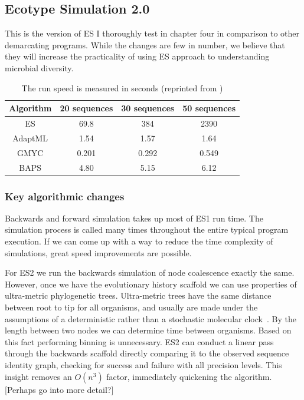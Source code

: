 \subsection*{Ecotype Simulation 2.0}
This is the version of ES I thoroughly test in chapter four in comparison to other demarcating programs.
While the changes are few in number, we believe that they will increase the practicality of using ES approach to understanding microbial diversity.

\begin{table}
 \begin{tabular}{| c | c | c | c |}
  \hline
  Algorithm & 20 sequences & 30 sequences & 50 sequences \\ \hline
  ES & 69.8 & 384 & 2390 \\
  AdaptML & 1.54 & 1.57 & 1.64 \\
  GMYC & 0.201 & 0.292 & 0.549 \\
  BAPS & 4.80 & 5.15 & 6.12 \\
  \hline
 \end{tabular}
 \caption[ES1 run-time compared to other demarcation programs.]{The run speed is measured in seconds (reprinted from \protect\cite{carlo})}
 \label{tab:ES1speed}
\end{table}

\subsubsection*{Key algorithmic changes}
Backwards and forward simulation takes up most of ES1 run time.
The simulation process is called many times throughout the entire typical program execution.
If we can come up with a way to reduce the time complexity of simulations, great speed improvements are possible.

For ES2 we run the backwards simulation of node coalescence exactly the same.
However, once we have the evolutionary history scaffold we can use properties of ultra-metric phylogenetic trees.
Ultra-metric trees have the same distance between root to tip for all organisms, and usually are made under the assumptions of a deterministic rather than a stochastic molecular clock~\cite{ho2008molecular}.
By the length between two nodes we can determine time between organisms.
Based on this fact performing binning is unnecessary.
ES2 can conduct a linear pass through the backwards scaffold directly comparing it to the observed sequence identity graph, checking for success and failure with all precision levels.
This insight removes an $O(n^3)$ factor, immediately quickening the algorithm. [Perhaps go into more detail?]

